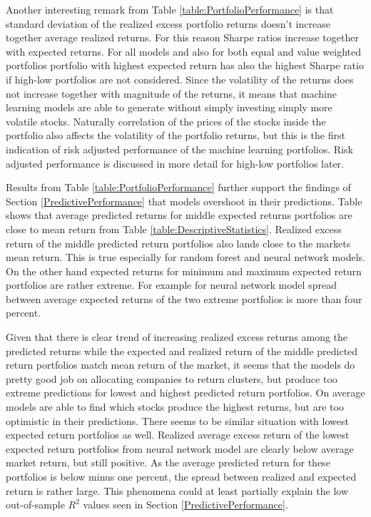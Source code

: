 \documentclass{article}
\begin{document}
Another interesting remark from Table \ref{table:PortfolioPerformance} is that standard deviation of the realized excess portfolio returns doesn't increase together average realized returns. For this reason Sharpe ratios increase together with expected returns. For all models and also for both equal and value weighted portfolios portfolio with highest expected return has also the highest Sharpe ratio if high-low portfolios are not considered. Since the volatility of the returns does not increase together with magnitude of the returns, it means that machine learning models are able to generate without simply investing simply more volatile stocks. Naturally correlation of the prices of the stocks inside the portfolio also affects the volatility of the portfolio returns, but this is the first indication of risk adjusted performance of the machine learning portfolios. Risk adjusted performance is discussed in more detail for high-low portfolios later. \par

Results from Table \ref{table:PortfolioPerformance} further support the findings of Section \ref{PredictivePerformance} that models overshoot in their predictions. Table shows that average predicted returns for middle expected returns portfolios are close to mean return from Table \ref{table:DescriptiveStatistics}. Realized excess return of the middle predicted return portfolios also lands close to the markets mean return. This is true especially for random forest and neural network models. On the other hand expected returns for minimum and maximum expected return portfolios are rather extreme. For example for neural network model spread between average expected returns of the two extreme portfolios is more than four percent. \par

Given that there is clear trend of increasing realized excess returns among the predicted returns while the expected and realized return of the middle predicted return portfolios match mean return of the market, it seems that the models do pretty good job on allocating companies to return clusters, but produce too extreme predictions for lowest and highest predicted return portfolios. On average models are able to find which stocks produce the highest returns, but are too optimistic in their predictions. There seems to be similar situation with lowest expected return portfolios as well. Realized average excess return of the lowest expected return portfolios from neural network model are clearly below average market return, but still positive. As the average predicted return for these portfolios is below minus one percent, the spread between realized and expected return is rather large. This phenomena could at least partially explain the low out-of-sample $R^2$ values seen in Section \ref{PredictivePerformance}. \par  
\end{document}
